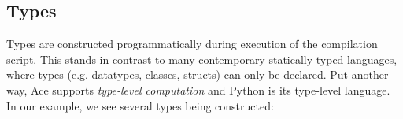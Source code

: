 
\subsection{Types}
Types are constructed programmatically during execution of the compilation script. This stands in contrast to many  contemporary statically-typed languages, where types (e.g. datatypes, classes, structs) can only be declared. Put another way, Ace supports \emph{type-level computation} and Python is its type-level language. 
In our example, we see several types being constructed:
